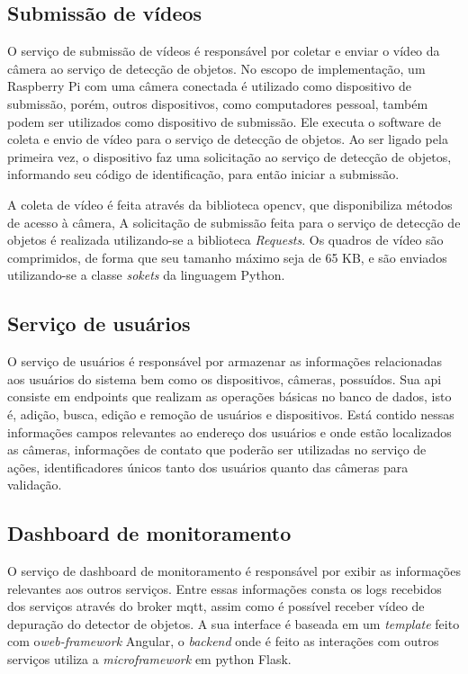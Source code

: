 \documentclass[]{politex}
\begin{document}
\subsection{Submissão de vídeos}
O serviço de submissão de vídeos é responsável por coletar e enviar o vídeo da câmera ao serviço de detecção de objetos. No escopo de implementação, um Raspberry Pi com uma câmera conectada é utilizado como dispositivo de submissão, porém, outros dispositivos, como computadores pessoal, também podem ser utilizados como dispositivo de submissão. Ele executa o software de coleta e envio de vídeo para o serviço de detecção de objetos. Ao ser ligado pela primeira vez, o dispositivo faz uma solicitação ao serviço de detecção de objetos, informando seu código de identificação, para então iniciar a submissão.

A coleta de vídeo é feita através da biblioteca \acrshort{opencv}, que disponibiliza métodos de acesso à câmera, A solicitação de submissão feita para o serviço de detecção de objetos é realizada utilizando-se a biblioteca \textit{Requests}. Os quadros de vídeo são comprimidos, de forma que seu tamanho máximo seja de 65 KB, e são enviados utilizando-se a classe \textit{sokets} da linguagem Python. 

\subsection{Serviço de usuários}
O serviço de usuários é responsável por armazenar as informações relacionadas aos usuários do sistema bem como os dispositivos, câmeras, possuídos. Sua \acrshort{api} consiste em endpoints que realizam as operações básicas no banco de dados, isto é, adição, busca, edição e remoção de usuários e dispositivos. Está contido nessas informações campos relevantes ao endereço dos usuários e onde estão localizados as câmeras, informações de contato que poderão ser utilizadas no serviço de ações, identificadores únicos tanto dos usuários quanto das câmeras para validação.

\subsection{Dashboard de monitoramento}
O serviço de dashboard de monitoramento é responsável por exibir as informações relevantes aos outros serviços. Entre essas informações consta os logs recebidos dos serviços através do broker \acrshort{mqtt}, assim como é possível receber vídeo de depuração do detector de objetos. A sua interface é baseada em um \textit{template} feito com o\textit{web-framework} Angular, o \textit{backend} onde é feito as interações com outros serviços utiliza a \textit{microframework} em python Flask.
\end{document}
